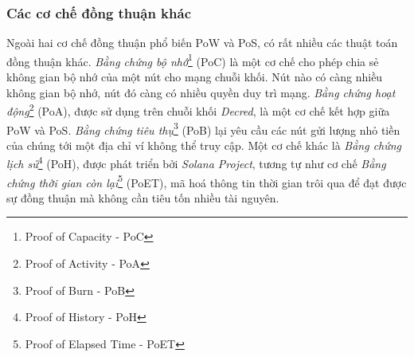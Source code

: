 \subsubsection{Các cơ chế đồng thuận khác}

Ngoài hai cơ chế đồng thuận phổ biến PoW và PoS, có rất nhiều các thuật toán đồng thuận khác. \textit{Bằng chứng bộ nhớ}\footnote{Proof of Capacity - PoC} (PoC) là một cơ chế cho phép chia sẻ không gian bộ nhớ của một nút cho mạng chuỗi khối. Nút nào có càng nhiều không gian bộ nhớ, nút đó càng có nhiều quyền duy trì mạng. \textit{Bằng chứng hoạt động}\footnote{Proof of Activity - PoA} (PoA), được sử dụng trên chuỗi khối \textit{Decred}, là một cơ chế kết hợp giữa PoW và PoS. \textit{Bằng chứng tiêu thụ}\footnote{Proof of Burn - PoB} (PoB) lại yêu cầu các nút gửi lượng nhỏ tiền của chúng tới một địa chỉ ví không thể truy cập. Một cơ chế khác là \textit{Bằng chứng lịch sử}\footnote{Proof of History - PoH} (PoH), được phát triển bởi \textit{Solana Project}, tương tự như cơ chế \textit{Bằng chứng thời gian còn lại}\footnote{Proof of Elapsed Time - PoET} (PoET), mã hoá thông tin thời gian trôi qua để đạt được sự đồng thuận mà không cần tiêu tốn nhiều tài nguyên.